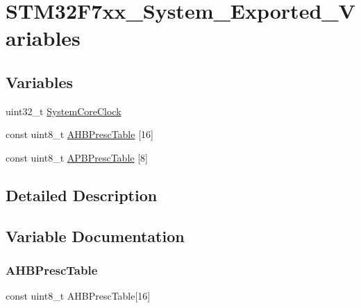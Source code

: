 \hypertarget{group___s_t_m32_f7xx___system___exported___variables}{}\section{S\+T\+M32\+F7xx\+\_\+\+System\+\_\+\+Exported\+\_\+\+Variables}
\label{group___s_t_m32_f7xx___system___exported___variables}
\subsection*{Variables}
\begin{DoxyCompactItemize}
\item 
uint32\+\_\+t \mbox{\hyperlink{group___s_t_m32_f7xx___system___exported___variables_gaa3cd3e43291e81e795d642b79b6088e6}{System\+Core\+Clock}}
\item 
const uint8\+\_\+t \mbox{\hyperlink{group___s_t_m32_f7xx___system___exported___variables_ga6e1d9cd666f0eacbfde31e9932a93466}{A\+H\+B\+Presc\+Table}} \mbox{[}16\mbox{]}
\item 
const uint8\+\_\+t \mbox{\hyperlink{group___s_t_m32_f7xx___system___exported___variables_ga5b4f8b768465842cf854a8f993b375e9}{A\+P\+B\+Presc\+Table}} \mbox{[}8\mbox{]}
\end{DoxyCompactItemize}


\subsection{Detailed Description}


\subsection{Variable Documentation}
\mbox{\label{group___s_t_m32_f7xx___system___exported___variables_ga6e1d9cd666f0eacbfde31e9932a93466}} 
\subsubsection{\texorpdfstring{AHBPrescTable}{AHBPrescTable}}
{\footnotesize\ttfamily const uint8\+\_\+t A\+H\+B\+Presc\+Table\mbox{[}16\mbox{]}}

